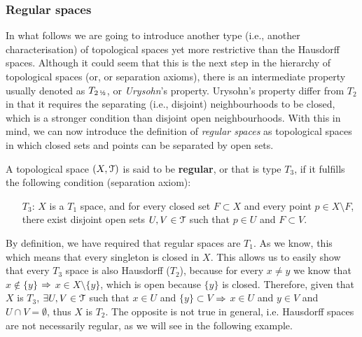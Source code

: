 \subsubsection{Regular spaces}\label{subsubsec:regular-spaces}

In what follows we are going to introduce another type (i.e., another characterisation) of topological spaces yet more restrictive than the Hausdorff spaces.
Although it could seem that this is the next step in the hierarchy of topological spaces (or, or separation axioms), there is an intermediate property usually denoted as $T_{2\,\text{\textonehalf}}$, or \emph{Urysohn}'s property.
Urysohn's property differ from $T_2$ in that it requires the separating (i.e., disjoint) neighbourhoods to be closed, which is a stronger condition than disjoint open neighbourhoods.
With this in mind, we can now introduce the definition of \emph{regular spaces} as topological spaces in which closed sets and points can be separated by open sets.

\begin{definition}
	\label{def:regular-space}
	A topological space $(X,\EuScript{T})$ is said to be \textbf{regular}, or that is type $T_3$, if it fulfills the following condition (separation axiom):
	\begin{itemize}
		\item[$T_3$:] $X$ is a $T_1$ space, and for every closed set $F\subset X$ and every point $p\in X\setminus F$, there exist disjoint open sets $U,V\in\EuScript{T}$ such that $p\in U$ and $F\subset V$.
	\end{itemize}
\end{definition}

\begin{remark}
	By definition, we have required that regular spaces are $T_1$.
	As we know, this which means that every singleton is closed in $X$.
	This allows us to easily show that every $T_3$ space is also Hausdorff ($T_2$), because for every $x\neq y$ we know that $x\notin \{y\}$ $\Rightarrow$ $x\in X\setminus\{y\}$, which is open because $\{y\}$ is closed.
	Therefore, given that $X$ is $T_3$, $\exists U,V\in\EuScript{T}$ such that $x\in U$ and $\{y\}\subset V$ $\Rightarrow$ $x\in U$ and $y\in V$ and $U\cap V=\emptyset$, thus $X$ is $T_2$. The opposite is not true in general, i.e. Hausdorff spaces are not necessarily regular,
	as we will see in the following example.
\end{remark}

